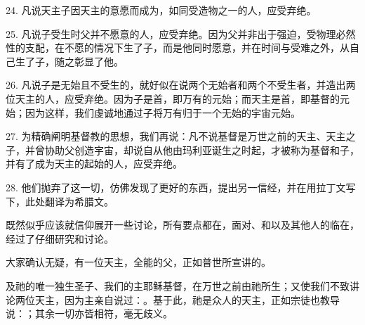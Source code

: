 24. 凡说天主子因天主的意愿而成为，如同受造物之一的人，应受弃绝。\par

25. 凡说子受生时父并不愿意的人，应受弃绝。因为父并非出于强迫，受物理必然性的支配，在不愿的情况下生了子，而是他同时愿意，并在时间与受难之外，从自己生了子，随之彰显了他。\par

26. 凡说子是无始且不受生的，就好似在说两个无始者和两个不受生者，并造出两位天主的人，应受弃绝。因为子是首，即万有的元始；而天主是首，即基督的元始；因为这样，我们虔诚地通过子将万有归于一个无始的宇宙元始。\par

27. 为精确阐明基督教的思想，我们再说：凡不说基督是万世之前的天主、天主之子，并曾协助父创造宇宙，却说自从他由玛利亚诞生之时起，才被称为基督和子，并有了成为天主的起始的人，应受弃绝。\par

28. 他们抛弃了这一切，仿佛发现了更好的东西，提出另一信经，并在用拉丁文写下，此处翻译为希腊文。\par

既然似乎应该就信仰展开一些讨论，所有要点都在，面对、和以及其他人的临在，经过了仔细研究和讨论。\par

大家确认无疑，有一位天主，全能的父，正如普世所宣讲的。\par

及祂的唯一独生圣子、我们的主耶稣基督，在万世之前由祂所生；又使我们不致讲论两位天主，因为主亲自说过：。基于此，祂是众人的天主，正如宗徒也教导说：；其余一切亦皆相符，毫无歧义。\par

